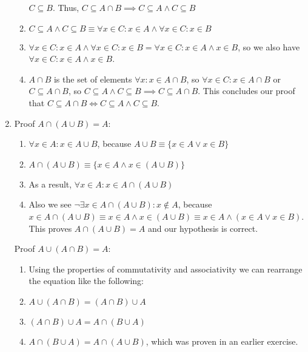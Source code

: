 \documentclass{article}
\begin{document}
\begin{enumerate}
\begin{enumerate}
                    $C \subseteq B$. Thus, $C \subseteq A \cap B \implies C \subseteq A \land C \subseteq B$
                \item $C \subseteq A \land C \subseteq B \equiv \forall x \in C: x \in A \land \forall x \in C: x \in B$
                \item $\forall x \in C: x \in A \land \forall x \in C: x \in B
                    = \forall x \in C: x \in A \land x \in B$, so we also have
                    $\forall x \in C: x \in A \land x \in B$.
                \item $A \cap B$ is the set of elements $\forall x: x \in A
                    \cap B$, so $\forall x \in C: x \in A \cap B$ or $C
                    \subseteq A \cap B$, so $C \subseteq A \land C \subseteq B
                    \implies C \subseteq A \cap B$. This concludes our proof
                    that $C \subseteq A \cap B \iff C \subseteq A \land C
                    \subseteq B$.
            \end{enumerate}
        \item Proof $A \cap (A \cup B) = A$:
            \begin{enumerate}
                \item $\forall x \in A: x \in A \cup B$, because $A \cup B \equiv \{x \in A \lor x \in B\}$
                \item $A \cap (A \cup B) \equiv \{x \in A \land x \in (A \cup B)\}$
                \item As a result, $\forall x \in A: x \in A \cap (A \cup B)$
                \item Also we see $\neg\exists x \in A \cap (A \cup B) : x
                    \notin A$, because $x \in A \cap (A \cup B) \equiv x \in A
                    \land x \in (A \cup B) \equiv x \in A \land (x \in A \lor x
                    \in B)$. This proves $A \cap (A \cup B) = A$ and our
                    hypothesis is correct.
            \end{enumerate}
            Proof $A \cup (A \cap B) = A$:
            \begin{enumerate}
                \item Using the properties of commutativity and associativity we can rearrange the equation like the following:
                \item $A \cup (A \cap B) = (A \cap B) \cup A$
                \item $(A \cap B) \cup A = A \cap (B \cup A)$
                \item $A \cap (B \cup A) = A \cap (A \cup B)$, which was proven in an earlier exercise.

\end{enumerate}
\end{enumerate}
\end{document}
